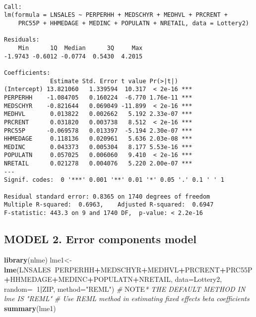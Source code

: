 \documentclass[]{book}
\newenvironment{Shaded}{\begin{snugshade}}{\end{snugshade}}
\newcommand{\AlertTok}[1]{\textcolor[rgb]{0.94,0.16,0.16}{#1}}
\newcommand{\CommentTok}[1]{\textcolor[rgb]{0.56,0.35,0.01}{\textit{#1}}}
\newcommand{\DataTypeTok}[1]{\textcolor[rgb]{0.13,0.29,0.53}{#1}}
\newcommand{\DecValTok}[1]{\textcolor[rgb]{0.00,0.00,0.81}{#1}}
\newcommand{\KeywordTok}[1]{\textcolor[rgb]{0.13,0.29,0.53}{\textbf{#1}}}
\newcommand{\NormalTok}[1]{#1}
\newcommand{\OperatorTok}[1]{\textcolor[rgb]{0.81,0.36,0.00}{\textbf{#1}}}
\newcommand{\StringTok}[1]{\textcolor[rgb]{0.31,0.60,0.02}{#1}}
\begin{document}
\begin{verbatim}

Call:
lm(formula = LNSALES ~ PERPERHH + MEDSCHYR + MEDHVL + PRCRENT + 
    PRC55P + HHMEDAGE + MEDINC + POPULATN + NRETAIL, data = Lottery2)

Residuals:
    Min      1Q  Median      3Q     Max 
-1.9743 -0.6012 -0.0774  0.5430  4.2015 

Coefficients:
             Estimate Std. Error t value Pr(>|t|)    
(Intercept) 13.821060   1.339594  10.317  < 2e-16 ***
PERPERHH    -1.084705   0.160224  -6.770 1.76e-11 ***
MEDSCHYR    -0.821644   0.069049 -11.899  < 2e-16 ***
MEDHVL       0.013822   0.002662   5.192 2.33e-07 ***
PRCRENT      0.031820   0.003738   8.512  < 2e-16 ***
PRC55P      -0.069578   0.013397  -5.194 2.30e-07 ***
HHMEDAGE     0.118136   0.020961   5.636 2.03e-08 ***
MEDINC       0.043373   0.005304   8.177 5.53e-16 ***
POPULATN     0.057025   0.006060   9.410  < 2e-16 ***
NRETAIL      0.021278   0.004076   5.220 2.00e-07 ***
---
Signif. codes:  0 '***' 0.001 '**' 0.01 '*' 0.05 '.' 0.1 ' ' 1

Residual standard error: 0.8365 on 1740 degrees of freedom
Multiple R-squared:  0.6963,    Adjusted R-squared:  0.6947 
F-statistic: 443.3 on 9 and 1740 DF,  p-value: < 2.2e-16
\end{verbatim}

\hypertarget{model-2.-error-components-model}{%
\subsection{MODEL 2. Error components model}\label{model-2.-error-components-model}}

\begin{Shaded}
\begin{Highlighting}[]
\KeywordTok{library}\NormalTok{(nlme)}
\NormalTok{lme1<-}\KeywordTok{lme}\NormalTok{(LNSALES}\OperatorTok{~}\NormalTok{PERPERHH}\OperatorTok{+}\NormalTok{MEDSCHYR}\OperatorTok{+}\NormalTok{MEDHVL}\OperatorTok{+}\NormalTok{PRCRENT}\OperatorTok{+}\NormalTok{PRC55P}\OperatorTok{+}\NormalTok{HHMEDAGE}\OperatorTok{+}\NormalTok{MEDINC}\OperatorTok{+}\NormalTok{POPULATN}\OperatorTok{+}\NormalTok{NRETAIL, }\DataTypeTok{data=}\NormalTok{Lottery2, }\DataTypeTok{random=}\OperatorTok{~}\DecValTok{1}\OperatorTok{|}\NormalTok{ZIP, }\DataTypeTok{method=}\StringTok{"REML"}\NormalTok{) }
\CommentTok{# }\AlertTok{NOTE}\CommentTok{* THE DEFAULT METHOD IN lme IS "REML"}
\CommentTok{# Use REML method in estimating fixed effects beta coefficients }
\KeywordTok{summary}\NormalTok{(lme1)}
\end{Highlighting}
\end{Shaded}
\end{document}

